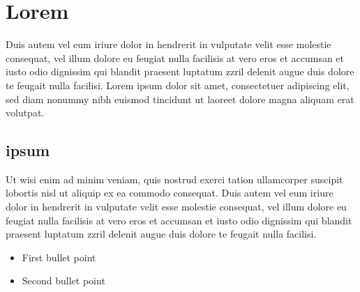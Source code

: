 \section{Lorem}
Duis autem vel eum iriure dolor in hendrerit in vulputate velit esse molestie consequat, vel illum dolore eu feugiat nulla facilisis at vero eros et accumsan et iusto odio dignissim qui blandit praesent luptatum zzril delenit augue duis dolore te feugait nulla facilisi. Lorem ipsum dolor sit amet, consectetuer adipiscing elit, sed diam nonummy nibh euismod tincidunt ut laoreet dolore magna aliquam erat volutpat.

\subsection{ipsum}
Ut wisi enim ad minim veniam, quis nostrud exerci tation ullamcorper suscipit lobortis nisl ut aliquip ex ea commodo consequat. Duis autem vel eum iriure dolor in hendrerit in vulputate velit esse molestie consequat, vel illum dolore eu feugiat nulla facilisis at vero eros et accumsan et iusto odio dignissim qui blandit praesent luptatum zzril delenit augue duis dolore te feugait nulla facilisi.


\begin{itemize}
    \item First bullet point
    \item Second bullet point
\end{itemize}
